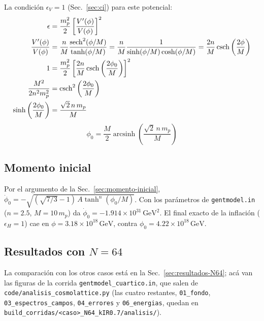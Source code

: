             La condición $\epsilon_V = 1$ (Sec.~\ref{sec:ci}) para este potencial:
            \begin{equation*}
                \begin{split}
                    \epsilon &= \frac{m_p^2}{2} \left[ \frac{V^\prime (\phi)}{V(\phi)} \right]^2\\
                    \frac{V^\prime (\phi)}{V(\phi)} &= \frac{n}{M} \frac{\sech^2 (\phi/M)}{\tanh (\phi/M)} = \frac{n}{M} \frac{1}{\sinh (\phi/M) \cosh (\phi/M)} = \frac{2n}{M} \csch \left( \frac{2\phi}{M} \right)\\
                    1 &= \frac{m_p^2}{2} \left[ \frac{2n}{M} \csch \left( \frac{2\phi_0}{M} \right) \right]^2\\
                    \frac{M^2}{2 n^2 m_p^2} &= \csch^2 \left( \frac{2 \phi_0}{M} \right)\\
                    \sinh \left( \frac{2 \phi_0}{M} \right) &= \frac{\sqrt{2} \, n \, m_p}{M}
                \end{split}
            \end{equation*}
            \begin{equation}
                \phi_0 = \frac{M}{2} \operatorname{arcsinh} \left( \frac{\sqrt{2} \, n \, m_p}{M} \right)
            \end{equation}

        \subsection{Momento inicial}
            \label{sec:momento-inicial-T}

            Por el argumento de la Sec.~\ref{sec:momento-inicial}, $\dot{\phi}_0 = -\sqrt{(\sqrt{7/3} - 1) \, A \tanh^n(\phi_0/M)}$. Con los parámetros de \texttt{gentmodel.in} ($n = 2.5$, $M = 10\,m_p$) da $\dot\phi_0 = -1.914 \times 10^{31}\,\text{GeV}^2$. El final exacto de la inflación ($\epsilon_H = 1$) cae en $\phi = 3.18 \times 10^{18}\,\text{GeV}$, contra $\phi_0 = 4.22 \times 10^{18}\,\text{GeV}$.

        \subsection{Resultados con $N = 64$}
            \label{sec:tmodel-N64}

            La comparación con los otros casos está en la Sec.~\ref{sec:resultados-N64}; acá van las figuras de la corrida \texttt{gentmodel\_cuartico.in}, que salen de \texttt{code/analisis\_cosmolattice.py} (las cuatro restantes, \texttt{01\_fondo}, \texttt{03\_espectros\_campos}, \texttt{04\_errores} y \texttt{06\_energias}, quedan en \texttt{build\_corridas/<caso>\_N64\_kIR0.7/analisis/}).


